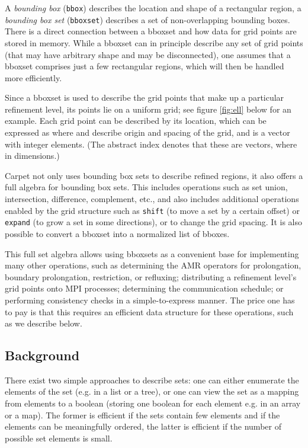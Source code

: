 \documentclass[conference]{IEEEtran}
\begin{document}
A \emph{bounding box} (\verb+bbox+) describes the location and shape
of a rectangular region, a \emph{bounding box set} (\verb+bboxset+)
describes a set of non-overlapping bounding boxes.
There is a direct connection between a bboxset and how data for grid
points are stored in memory.
While a bboxset
can in principle describe any set of grid points (that may have
arbitrary shape and may be disconnected), one assumes that a bboxset
comprises just a few rectangular regions, which will then be handled more
efficiently.

Since a bboxset is used to describe the grid points that make up a
particular refinement level, its points lie on a uniform
grid; see figure \ref{fig:ell} below for an example.
Each grid point can be described by its location, which
can be expressed as  where  and
 describe origin and spacing of the grid, and 
is a vector with integer elements. (The abstract index  denotes
that these are vectors, where  in  dimensions.)

Carpet not only uses bounding box sets to describe refined regions, it
also offers a full algebra for bounding box sets. This includes
operations such as set union, intersection, difference, complement,
etc., and also includes additional operations enabled by the grid
structure such as \verb+shift+ (to move a set by a certain offset) or
\verb+expand+ (to grow a set in some directions), or to change the
grid spacing. It is also possible to convert a
bboxset into a normalized list of bboxes.

This full set algebra allows using bboxsets as a convenient base
for implementing many other operations, such as
determining the AMR operators for prolongation, boundary
prolongation, restriction, or refluxing; distributing a refinement
level's grid points onto MPI processes; determining the communication
schedule; or performing consistency checks in a simple-to-express
manner. The price one has to pay is that this requires an efficient
data structure for these operations, such as we describe below.

\subsection{Background}

There exist two simple approaches to
describe sets: one can either enumerate the elements of the set (e.g.
in a list or a tree), or one can view the set as a mapping from
elements to a boolean (storing one boolean for each element e.g. in an
array or a map). The former is efficient if the sets contain few
elements and if the elements can be meaningfully ordered, the latter
is efficient if the number of possible set elements is small.
\end{document}
